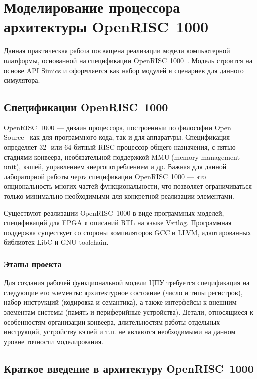 \chapter{Моделирование процессора архитектуры OpenRISC~1000}\label{chap:lab06}

Данная практическая работа посвящена реализации модели компьютерной платформы, основанной на спецификации OpenRISC~1000~\cite{or1k-spec}. Модель строится на основе API Simics и оформляется как набор модулей и сценариев для данного симулятора.

\section{Спецификации OpenRISC~1000}

OpenRISC~1000 --- дизайн процессора, построенный по философии Open Source~\cite{open-source-definition-ru} как для программного кода, так и для аппаратуры. Спецификация определяет 32- или 64-битный RISC-процессор общего назначения, с пятью стадиями конвеера, необязательной поддержкой MMU (\abbr memory management unit), кэшей, управлением энергопотреблением и др. Важная для данной лабораторной работы черта спецификации OpenRISC~1000 --- это опциональность многих частей функциональности, что позволяет ограничиваться только минимально необходимыми для конкретной реализации элементами.

Существуют реализации OpenRISC~1000 в виде программных моделей, спецификаций для FPGA и описаний RTL на языке Verilog. Программная поддержка существует со стороны компиляторов GCC и LLVM, адаптированных библиотек LibC и GNU toolchain.

\subsection{Этапы проекта}

Для создания рабочей функциональной модели ЦПУ требуется спецификация на следующие его элементы: архитектурное состояние (число и типы регистров), набор инструкций (кодировка и семантика), а также интерфейсы к внешним элементам системы (память и периферийные устройства). Детали, относящиеся к особенностям организации конвеера, длительностям работы отдельных инструкций, устройству кэшей и т.п. не являются необходимыми на данном уровне точности моделирования.

\section{Краткое введение в архитектуру OpenRISC~1000}

